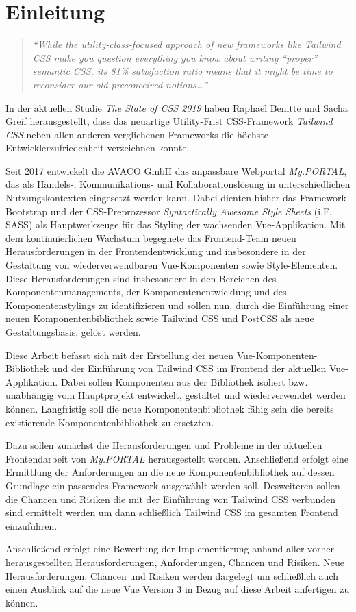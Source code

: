 \chapter{Einleitung}
\label{cha:Einleitung}

\begin{quotation}
	\emph{``While the utility-class-focused approach of new frameworks like Tailwind CSS make you question everything you know about writing “proper” semantic CSS, its 81\% satisfaction ratio means that it might be time to reconsider our old preconceived notions…''}
	\citep{StateCSS2019_Frameworks}
\end{quotation}

In der aktuellen Studie \textit{The State of CSS 2019} haben Raphaël Benitte und Sacha Greif herausgestellt, dass das neuartige Utility-Frist CSS-Framework \textit{Tailwind CSS} neben allen anderen verglichenen Frameworks die höchste Entwicklerzufriedenheit verzeichnen konnte.

Seit 2017 entwickelt die AVACO GmbH das anpassbare Webportal \textit{My.PORTAL}, das als Handels-, Kommunikations- und Kollaborationslösung in unterschiedlichen Nutzungskontexten eingesetzt werden kann. Dabei dienten bisher das Framework Bootstrap und der CSS-Preprozessor \textit{Syntactically Awesome Style Sheets} (i.F. SASS) als Hauptwerkzeuge für das Styling der wachsenden Vue-Applikation. Mit dem kontinuierlichen Wachstum begegnete das Frontend-Team neuen Herausforderungen in der Frontendentwicklung und insbesondere in der Gestaltung von wiederverwendbaren Vue-Komponenten sowie Style-Elementen. Diese Herausforderungen sind insbesondere in den Bereichen des Komponentenmanagements, der Komponentenentwicklung und des Komponentenstylings zu identifizieren und sollen nun, durch die Einführung einer neuen Komponentenbibliothek sowie Tailwind CSS und PostCSS als neue Gestaltungsbasis, gelöst werden.

Diese Arbeit befasst sich mit der Erstellung der neuen Vue-Komponenten-Bibliothek und der Einführung von Tailwind CSS im Frontend der aktuellen Vue-Applikation.
Dabei sollen Komponenten aus der Bibliothek isoliert bzw. unabhängig vom Hauptprojekt entwickelt, gestaltet und wiederverwendet werden können. Langfristig soll die neue Komponentenbibliothek fähig sein die bereits existierende Komponentenbibliothek zu ersetzten.

Dazu sollen zunächst die Herausforderungen und Probleme in der aktuellen Frontendarbeit von \textit{My.PORTAL} herausgestellt werden. Anschließend erfolgt eine Ermittlung der Anforderungen an die neue Komponentenbibliothek auf dessen Grundlage ein passendes Framework ausgewählt werden soll. Desweiteren sollen die Chancen und Risiken die mit der Einführung von Tailwind CSS verbunden sind ermittelt werden um dann schließlich Tailwind CSS im gesamten Frontend einzuführen.

Anschließend erfolgt eine Bewertung der Implementierung anhand aller vorher herausgestellten Herausforderungen, Anforderungen, Chancen und Risiken. Neue Herausforderungen, Chancen und Risiken werden dargelegt um schließlich auch einen Ausblick auf die neue Vue Version 3 in Bezug auf diese Arbeit anfertigen zu können.